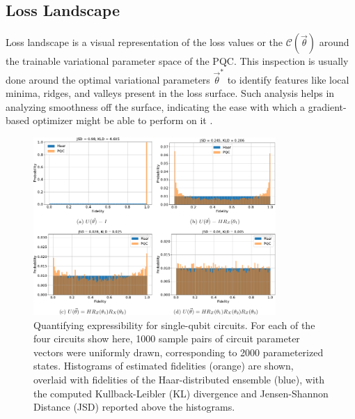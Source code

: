 \subsection{Loss Landscape}

Loss landscape is a visual representation of the loss values or the $\mathcal{C}(\vec{\theta})$ around the trainable variational parameter space of the PQC. This inspection is usually done around the optimal variational parameters $\vec{\theta}^{*}$ to identify features like local minima, ridges, and valleys present in the loss surface. Such analysis helps in analyzing smoothness off the surface, indicating the ease with which a gradient-based optimizer might be able to perform on it \cite{loss-landscapes}. 

\begin{figure}[!tp]
    \centering
    \includegraphics[width=0.82\textwidth]{figures/qleet/expressibility.pdf}
    \caption[Quantifying expressibility for single-qubit circuits]{Quantifying expressibility for single-qubit circuits. For each of the four circuits show here, 1000 sample pairs of circuit parameter vectors were uniformly drawn, corresponding to 2000 parameterized states. Histograms of estimated fidelities (orange) are shown, overlaid with fidelities of the Haar-distributed ensemble (blue), with the computed Kullback-Leibler (KL) divergence and Jensen-Shannon Distance (JSD) reported above the histograms.}
    \label{fig:expressibility}
\end{figure}

